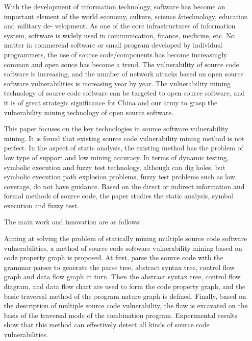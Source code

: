 \begin{eabstract}

With the development of information technology, software has become an important
element of the world economy, culture, science \&technology, education and military de-
velopment. As one of the core infrastructures of information system, software is widely
used in communication, finance, medicine, etc. No matter in commercial software or small program developed by individual programmers, the use of source code/components has become increasingly common and open souce has become a trend. The vulnerability of source code software is increasing, and the number of network attacks based on open source software vulnerabilities is increasing year by year. The vulnerability mining technology of source code software can be targeted to open source software, and it is of great strategic significance for China and our army to grasp the vulnerability mining technology of open source software.

This paper focuses on the key technologies in source software vulnerability mining. It is found that existing source code vulnerability mining method is not perfect. In the aspect of static analysis, the existing method has the problem of low type of support and low mining accuracy. In terms of dynamic testing, symbolic execution and fuzzy test technology, although can dig holes, but symbolic execution path explosion problems, fuzzy test problems such as low coverage, do not have guidance. Based on the direct or indirect information and formal methods of source code, the paper studies the static analysis, symbol execution and fuzzy test.


The main work and innovation are as follows:

Aiming at solving the problem of statically mining multiple source code software vulnerabilities, a method of source code software vulnerability mining based on code property graph is proposed. At first, parse the source code with the grammar parser to generate the parse tree, abstract syntax tree, control flow graph and data flow graph in turn. Then the abstract syntax tree, control flow diagram, and data flow chart are used to form the code property graph, and the basic traversal method of the program nature graph is defined. Finally, based on the description of multiple source code vulnerability, the flaw is excavated on the basis of the traversal mode of the combination program. Experimental results show that this method can effectively detect all kinds of source code vulnerabilities.


\end{eabstract}
